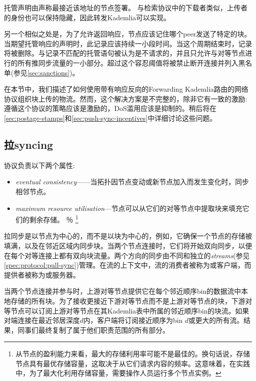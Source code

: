 托管声明由声称最接近该地址的节点签署。
与检索协议中的下载者类似，上传者的身份也可以保持隐藏，因此转发Kademlia可以实现。

另一个相似之处是，为了允许返回响应，节点应该记住哪个peer发送了特定的块。当期望托管响应的声明时，此记录应该持续一小段时间。当这个周期结束时，记录将被删除。与记录不匹配的托管语句被认为是不请求的，并且只允许与对等节点进行的所有推同步流量的一小部分。超过这个容忍阈值将被禁止断开连接并列入黑名单(参见\ref{sec:sanctions})。

在本节中，我们描述了如何使用带有响应反向的Forwarding Kademlia路由的网络协议组织块上传的物流。然而，这个解决方案是不完整的，除非它有一致的激励:遵循这个协议的策略应该是激励的，DoS滥用应该是抑制的。稍后将在\ref{sec:postage-stamps}和\ref{sec:push-sync-incentives}中详细讨论这些问题。

\subsection{拉syncing\statusgreen}\label{sec:pull-syncing}

协议负责以下两个属性: 

\begin{itemize}
    \item \emph{eventual consistency}——当拓扑因节点变动或新节点加入而发生变化时，同步相邻节点。
    \item \emph{maximum resource utilisation}—节点可以从它们的对等节点中提取块来填充它们的剩余存储。%
％
\footnote{从节点的盈利能力来看，最大的存储利用率可能不是最佳的。换句话说，存储节点具有最优存储容量，这取决于从它们请求内容的频率。这意味着，在实践中，为了最大化利用存储容量，需要操作人员运行多个节点实例。}
\end{itemize}

拉同步是以节点为中心的，而不是以块为中心的，例如，它确保一个节点的存储被填满，以及在邻近区域内同步块。当两个节点连接时，它们将开始双向同步，以便在每个对等连接上都有双向块流量。两个方向的同步由不同和独立的\emph{streams}(参见\ref{spec:protocol:pull-sync})管理。在流的上下文中，流的消费者被称为或客户端，而提供者被称为或服务器。 

当两个节点连接并参与时，上游对等节点提供它在每个邻近顺序bin的数据流中本地存储的所有块。为了接收更接近下游对等节点而不是上游对等节点的块，下游对等节点可以订阅上游对等节点在其Kademlia表中所属的邻近顺序bin的块流。如果对端连接在最近邻居深度$d$内，客户端将订阅接近顺序为bin $d$或更大的所有流。结果，同事们最终复制了属于他们职责范围的所有部分。

